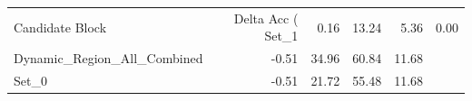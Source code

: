 \begin{tabular}{lrrrr}
\toprule
Candidate Block & Delta Acc (%
\midrule
Set_1 & 0.16 & 13.24 & 5.36 & 0.00 \\
Dynamic_Region_All_Combined & -0.51 & 34.96 & 60.84 & 11.68 \\
Set_0 & -0.51 & 21.72 & 55.48 & 11.68 \\
\bottomrule
\end{tabular}
